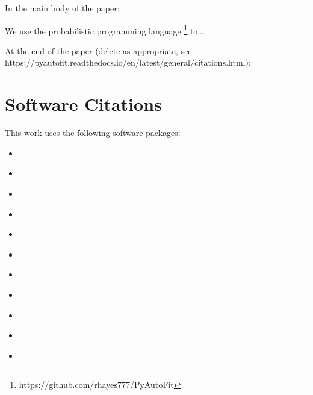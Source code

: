 In the main body of the paper:

We use the probabilistic programming language \footnote{https://github.com/rhayes777/PyAutoFit} \citep{pyautofit} to...

At the end of the paper (delete as appropriate, see https://pyautofit.readthedocs.io/en/latest/general/citations.html):

\section*{Software Citations}

This work uses the following software packages:

\begin{itemize}

\item
\href{https://github.com/dfm/corner.py}{}
\citep{corner}

\item
\href{https://github.com/joshspeagle/dynesty}{}
\citep{dynesty}

\item
\href{https://github.com/dfm/emcee}{}
\citep{emcee}

\item
\href{https://github.com/matplotlib/matplotlib}{}
\citep{matplotlib}

\item
\href{https://github.com/numpy/numpy}{}
\citep{numpy}

\item
\href{https://github.com/JohannesBuchner/PyMultiNest}{}
\citep{multinest, pymultinest}

\item
\href{https://github.com/ljvmiranda921/pyswarms}{}
\citep{pyswarms}

\item
\href{https://www.python.org/}{}
\citep{python}

\item
\href{https://github.com/scipy/scipy}{}
\citep{scipy}

\item
\href{https://github.com/JohannesBuchner/UltraNest}{}
\citep{ultranest}

\item
\href{https://github.com/minaskar/zeus}{}
\citep{zeus1, zeus2}

\end{itemize}